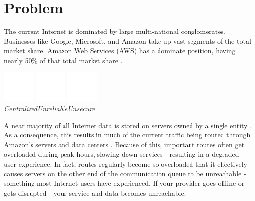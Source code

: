 \documentclass{article}
\begin{document}
\newpage
\section{Problem}
The current Internet is dominated by large multi-national conglomerates. Businesses like Google, Microsoft, and Amazon take up vast segments of the total market share. Amazon Web Services (AWS) has a dominate position, having nearly 50\% of that total market share \cite{jeb2019}.

\begin{center}
\includegraphics[width=45pt]{centralized}
\hspace{1.5cm}
\includegraphics[width=45pt]{unreliable}
\hspace{1.5cm}
\includegraphics[width=45pt]{unsecure}
\\
\vspace{0.1cm}
\hspace{0pt}\emph{Centralized}\hspace{50pt}\emph{Unreliable}\hspace{54pt}\emph{Unsecure}\hspace{24pt}
\end{center}

\noindent A near majority of all Internet data is stored on servers owned by a single entity \cite{jeb2019}. As a consequence, this results in much of the current traffic being routed through Amazon’s servers and data centers \cite{jeb2019}. Because of this, important routes often get overloaded during peak hours, slowing down services - resulting in a degraded user experience. In fact, routes regularly become so overloaded that it effectively causes servers on the other end of the communication queue to be unreachable - something most Internet users have experienced. If your provider goes offline or gets disrupted - your service and data becomes unreachable.
\end{document}
